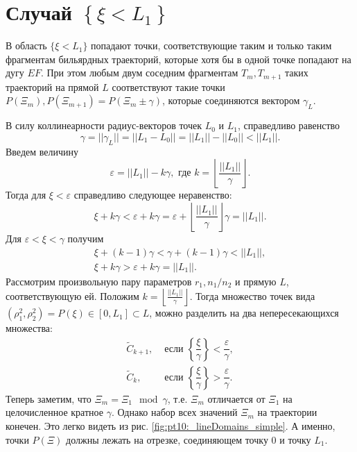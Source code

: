 
\section{Случай $\left\{\xi < L_1\right\}$}\label{sec:ch5/sec3}

В область $\{ \xi < L_1\}$ попадают точки, соответствующие таким и только таким фрагментам бильярдных траекторий, которые хотя бы в одной точке попадают на дугу $EF$. 
При этом любым двум соседним фрагментам $T_m, T_{m+1}$ таких траекторий на прямой $L$ соответствуют такие точки $P(\Xi_m), P(\Xi_{m+1}) = P(\Xi_m \pm \gamma)$, которые соединяются вектором $\gamma_L$.

В силу коллинеарности радиус-векторов точек $L_0$ и $L_1$,  справедливо равенство 
$$\gamma = ||\gamma_L|| = ||L_1-L_0|| = ||L_1||-||L_0|| < ||L_1||.$$
Введем величину 
\begin{equation}
\varepsilon = ||L_1||  - k \gamma, \text{ где } k=\left \lfloor \frac{||L_1||}{\gamma} \right \rfloor.
\label{eq:kDef}
\end{equation}
Тогда для $\xi < \varepsilon$ справедливо следующее неравенство:
$$\xi + k \gamma < \varepsilon + k \gamma =
 \varepsilon + \left \lfloor \frac{||L_1||}{\gamma} \right \rfloor \gamma = ||L_1||.$$
Для $\varepsilon< \xi <\gamma$ получим
\[
\begin{array}{cc}
\xi + (k-1) \gamma  < \gamma + (k-1) \gamma < ||L_1||, \\
\xi + k \gamma  > \varepsilon + k \gamma =  ||L_1||.
\end{array}
\] 
Рассмотрим произвольную пару параметров $r_1, n_1/n_2$ и прямую $L$, соответствующую ей. Положим $k=\left \lfloor \frac{||L_1||}{\gamma} \right \rfloor$. Тогда множество точек вида $(\rho_1^2, \rho_2^2) = P(\xi) \in [0, L_1] \subset L$, можно разделить на два непересекающихся множества:
\begin{equation*}
\begin{array}{ll}
    \widetilde{C}_{k+1}, & \text{ если } \left\{\dfrac{\xi}{\gamma}\right\} < \dfrac{\varepsilon}{\gamma}, \\
    \widetilde{C}_k, & \text{ если } \left\{\dfrac{\xi}{\gamma}\right\} > \dfrac{\varepsilon}{\gamma}.
\end{array}
\end{equation*} 
Теперь заметим, что $\Xi_m = \Xi_1 \mod \gamma$,
т.е. $\Xi_m$ отличается от $\Xi_1$ на целочисленное кратное $\gamma$. Однако набор всех значений $\Xi_m$ на траектории конечен. Это легко видеть из рис.     \ref{fig:pt10:_lineDomains_simple}. А именно, точки $P(\Xi)$ должны лежать на отрезке, соединяющем точку $0$ и точку $L_1$.

